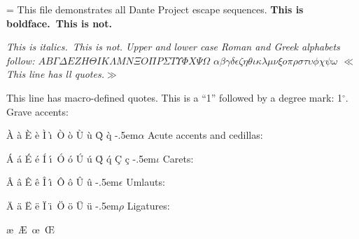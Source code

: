 
\magnification=
This file demonstrates all Dante Project escape sequences.
\bigskip
\bf This is boldface.\rm\ This is not.

\sl This is italics.\rm\ This is not.
\bigskip
Upper and lower case Roman and Greek alphabets follow:
\bigskip
$AB\Gamma\Delta EZH\Theta IK\Lambda MN\Xi O\Pi P\Sigma T\Upsilon\Phi X\Psi\Omega$
\bigskip
$\alpha\beta\gamma\delta\epsilon\zeta\eta\theta\iota\kappa\lambda\mu\nu\xi%
o\pi\rho\sigma\tau\upsilon\phi\chi\psi\omega$
\bigskip
$\ll$This line has ll quotes.$\gg$

\<This line has macro-defined quotes.\>
\bigskip
This is a ``1'' followed by a degree mark: 1$^\circ$.
\bigskip
Grave accents:

\`A \`a \`E \`e \`I \`\i\ \`O \`o \`U \`u \`Q \`q \`{{\kern -.5em}$\alpha$}
\bigskip
Acute accents and cedillas:

\'A \'a \'E \'e \'I \'\i\ \'O \'o \'U \'u \'Q \'q \c C \c c \'{{\kern -.5em}$\iota$}
\bigskip
Carets:

\^A \^a \^E \^e \^I \^\i\ \^O \^o \^U \^u \^{{\kern -.5em}$\epsilon$}
\bigskip
Umlauts:

\"A \"a \"E \"e \"I \"\i\ \"O \"o \"U \"u \"{{\kern -.5em}$\rho$}
\bigskip
Ligatures:

\ae\ \AE\ \oe\ \OE
\bye
